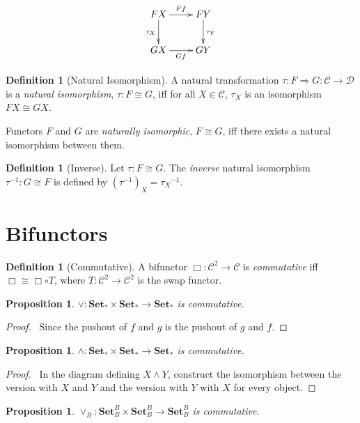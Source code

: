 \documentclass{book}
\let\qed\relax
\newtheorem{prop}[ax]{Proposition}
\theoremstyle{definition}
\newtheorem{df}[ax]{Definition}
\newcommand{\inv}[1]{\ensuremath{{#1}^{-1}}}
\newcommand{\Set}{\ensuremath{\mathbf{Set}}}
\begin{document}
\[ \xymatrix{
FX \ar[r]^{Ff} \ar[d]_{\tau_X} & FY \ar[d]^{\tau_Y} \\
GX \ar[r]_{Gf} & GY
} \]

\begin{df}[Natural Isomorphism]
A natural transformation $\tau : F \Rightarrow G : \mathcal{C} \rightarrow \mathcal{D}$ is a \emph{natural isomorphism}, $\tau : F \cong G$, iff for all $X \in \mathcal{C}$, $\tau_X$ is an isomorphism $F X \cong G X$.

Functors $F$ and $G$ are \emph{naturally isomorphic}, $F \cong G$, iff there exists a natural isomorphism between them.
\end{df}

\begin{df}[Inverse]
Let $\tau : F \cong G$. The \emph{inverse} natural isomorphism $\inv{\tau} : G \cong F$ is defined by $(\inv{\tau})_X = \inv{\tau_X}$.
\end{df}

\section{Bifunctors}

\begin{df}[Commutative]
A bifunctor $\Box : \mathcal{C}^2 \rightarrow \mathcal{C}$ is \emph{commutative} iff $\Box \cong \Box \circ T$, where $T : \mathcal{C}^2 \rightarrow \mathcal{C}^2$ is the swap functor.
\end{df}

\begin{prop}
$\vee : \Set_* \times \Set_* \rightarrow \Set_*$ is commutative.
\end{prop}

\begin{proof}
\pf\ Since the pushout of $f$ and $g$ is the pushout of $g$ and $f$. \qed
\end{proof}

\begin{prop}
$\wedge : \Set_* \times \Set_* \rightarrow \Set_*$ is commutative.
\end{prop}

\begin{proof}
\pf\ In the diagram defining $X \wedge Y$, construct the isomorphism between the version with $X$ and $Y$ and the version with $Y$ with $X$ for every object. \qed
\end{proof}

\begin{prop}
$\vee_B : \Set_B^B \times \Set_B^B \rightarrow \Set_B^B$ is commutative.
\end{prop}
\end{document}
